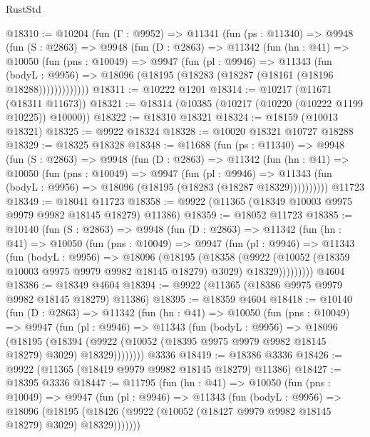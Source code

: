 \begin{lexlean}{RustStd}
\begin{coremodule}
@18310 := @10204
    (fun (Γ : @9952) =>
    @11341
      (fun (ps : @11340) =>
      @9948
        (fun (S : @2863) =>
        @9948
          (fun (D : @2863) =>
          @11342
            (fun (hn : @41) =>
            @10050
              (fun (pns : @10049) =>
              @9947
                (fun (pl : @9946) =>
                @11343
                  (fun (bodyL : @9956) =>
                  @18096 (@18195 (@18283 (@18287 (@18161 (@18196 @18288)))))))))))))
@18311 := @10222 @1201
@18314 := @10217 (@11671 (@18311 @11673))
@18321 := @18314 (@10385 (@10217 (@10220 (@10222 @1199 @10225)) @10000))
@18322 := @18310 @18321
@18324 := @18159 (@10013 @18321)
@18325 := @9922 @18324
@18328 := @10020 @18321 @10727 @18288
@18329 := @18325 @18328
@18348 := @11688
    (fun (ps : @11340) =>
    @9948
      (fun (S : @2863) =>
      @9948
        (fun (D : @2863) =>
        @11342
          (fun (hn : @41) =>
          @10050
            (fun (pns : @10049) =>
            @9947
              (fun (pl : @9946) =>
              @11343 (fun (bodyL : @9956) => @18096 (@18195 (@18283 (@18287 @18329))))))))))
    @11723
@18349 := @18041 @11723
@18358 := @9922 (@11365 (@18349 @10003 @9975 @9979 @9982 @18145 @18279) @11386)
@18359 := @18052 @11723
@18385 := @10140
    (fun (S : @2863) =>
    @9948
      (fun (D : @2863) =>
      @11342
        (fun (hn : @41) =>
        @10050
          (fun (pns : @10049) =>
          @9947
            (fun (pl : @9946) =>
            @11343
              (fun (bodyL : @9956) =>
              @18096
                (@18195
                  (@18358
                    (@9922
                      (@10052 (@18359 @10003 @9975 @9979 @9982 @18145 @18279) @3029)
                      @18329)))))))))
    @4604
@18386 := @18349 @4604
@18394 := @9922 (@11365 (@18386 @9975 @9979 @9982 @18145 @18279) @11386)
@18395 := @18359 @4604
@18418 := @10140
    (fun (D : @2863) =>
    @11342
      (fun (hn : @41) =>
      @10050
        (fun (pns : @10049) =>
        @9947
          (fun (pl : @9946) =>
          @11343
            (fun (bodyL : @9956) =>
            @18096
              (@18195
                (@18394
                  (@9922 (@10052 (@18395 @9975 @9979 @9982 @18145 @18279) @3029) @18329))))))))
    @3336
@18419 := @18386 @3336
@18426 := @9922 (@11365 (@18419 @9979 @9982 @18145 @18279) @11386)
@18427 := @18395 @3336
@18447 := @11795
    (fun (hn : @41) =>
    @10050
      (fun (pns : @10049) =>
      @9947
        (fun (pl : @9946) =>
        @11343
          (fun (bodyL : @9956) =>
          @18096
            (@18195 (@18426 (@9922 (@10052 (@18427 @9979 @9982 @18145 @18279) @3029) @18329)))))))

\end{coremodule}
\end{lexlean}
